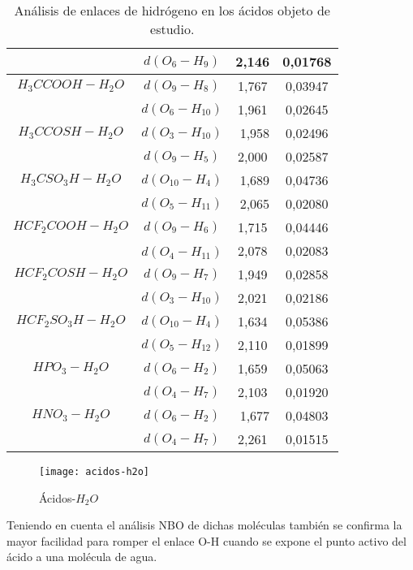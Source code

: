 \begin{table}[H]
\begin{tabular}{|c|c|c|c|}
	& $d(O_6-H_9)$ & 2,146	& 0,01768 \\ \hline
 $H_3CCOOH-H_2O$ & $d(O_9-H_8)$ & 1,767	& 0,03947 \\ \cline{2-4}
	& $d(O_6-H_{10})$ & 1,961 &	0,02645 \\ \hline
 $H_3CCOSH-H_2O$ &	$d(O_3-H_{10})$	&﻿ 1,958 &	0,02496 \\ \cline{2-4}
	& $d(O_9-H_5)$	& ﻿2,000	& 0,02587 \\ \hline
 $H_3CSO_3H-H_2O$	& $d(O_{10}-H_4)$	&﻿ 1,689	& 0,04736 \\ \cline{2-4}
	& $d(O_5-H_{11})$	&﻿ 2,065 &	0,02080 \\ \hline
 $HCF_2COOH-H_2O$	& $d(O_9-H_6)$	&﻿1,715	& 0,04446 \\ \cline{2-4}
	& $d(O_4-H_{11})$﻿ & 2,078	& 0,02083 \\ \hline
 $HCF_2COSH-H_2O$	& $d(O_9-H_7)$ &1,949 & 0,02858 \\ \cline{2-4}
	& $d(O_3-H_{10})$ & 2,021 &	0,02186 \\ \hline
 $HCF_2SO_3H-H_2O$	& $d(O_{10}-H_4)$ & 1,634	& 0,05386 \\ \cline{2-4}
&	$d(O_5-H_{12})$ & 2,110	& 0,01899 \\ \hline
 $HPO_3-H_2O$	& $d(O_6-H_2)$ & 1,659	& 0,05063 \\ \cline{2-4}
	& $d(O_4-H_7)$ & 2,103	& 0,01920 \\ \hline
 $HNO_3-H_2O$	& $d(O_6-H_2)$	&﻿ 1,677	& 0,04803 \\ \cline{2-4}
	& $d(O_4-H_7)$ & 2,261	& 0,01515 \\ \hline
	\end{tabular}
\caption{Análisis de enlaces de hidrógeno en los ácidos objeto de estudio.}
\end{table}
\begin{figure}[H]
	\centering
	\texttt{[image: acidos-h2o]}
	\caption{Ácidos-$H_2O$}
\end{figure}
 Teniendo en cuenta el análisis NBO de dichas moléculas también se confirma la mayor facilidad para romper el enlace O-H cuando se expone el punto activo del ácido a una molécula de agua.
 

